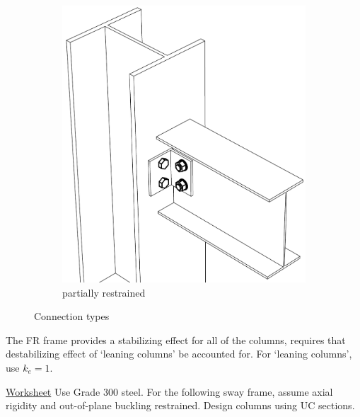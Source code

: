 \begin{figure}[H]
\begin{subfigure}{.5\linewidth}
\includegraphics[width=.9\linewidth]{PIC/CH04/PR}
\caption{partially restrained}
\end{subfigure}
\caption{Connection types}
\end{figure}
\begin{figure}[H]
\centering
\end{figure}
The FR frame provides a stabilizing effect for all of the columns, \NZSSTEEL{} requires that destabilizing effect of `leaning columns' be accounted for. For `leaning columns', use $k_e=1$.
\begin{exmp}\href{run:./WORKSHEET/CH04/EX4.ACLC.sm}{Worksheet}
Use Grade 300 steel. For the following sway frame, assume axial rigidity and out-of-plane buckling restrained. Design columns using UC sections.
\begin{figure}[H]

\end{figure}
\end{exmp}
